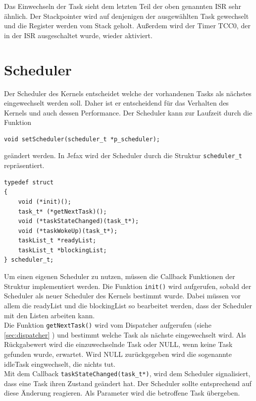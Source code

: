 \documentclass[fontsize=12pt, toc=bibliography, notitlepage]{scrreprt}
\newcommand{\refnn}[1]{\ref{#1} \nameref{#1}}
\begin{document}
Das Einwechseln der Task sieht dem letzten Teil der oben genannten ISR sehr ähnlich. Der Stackpointer wird auf denjenigen der ausgewählten Task gewechselt und die Register werden vom Stack geholt. Außerdem wird der Timer TCC0, der in der ISR ausgeschaltet wurde, wieder aktiviert. 

\newpage

\section{Scheduler}
\label{sec:scheduler}
Der Scheduler des Kernels entscheidet welche der vorhandenen Tasks als nächstes eingewechselt werden soll. Daher ist er entscheidend für das Verhalten des Kernels und auch dessen Performance. Der Scheduler kann zur Laufzeit durch die Funktion

\begin{lstlisting}
void setScheduler(scheduler_t *p_scheduler);
\end{lstlisting}

geändert werden. In Jefax wird der Scheduler durch die Struktur \verb|scheduler_t| repräsentiert.

\begin{lstlisting}[title=scheduler.h]
typedef struct
{
	void (*init)();
	task_t* (*getNextTask)();
	void (*taskStateChanged)(task_t*);
	void (*taskWokeUp)(task_t*);
	taskList_t *readyList;
	taskList_t *blockingList;
} scheduler_t;
\end{lstlisting}

Um einen eigenen Scheduler zu nutzen, müssen die Callback Funktionen der Struktur implementiert werden. Die Funktion \lstinline$init()$ wird aufgerufen, sobald der Scheduler als neuer Scheduler des Kernels bestimmt wurde. Dabei müssen vor allem die readyList und die blockingList so bearbeitet werden, dass der Scheduler mit den Listen arbeiten kann.\\

Die Funktion \lstinline$getNextTask()$ wird vom Dispatcher aufgerufen (siehe \refnn{sec:dispatcher}) und bestimmt welche Task als nächste eingewechselt wird. Als Rückgabewert wird die einzuwechselnde Task oder NULL, wenn keine Task gefunden wurde, erwartet. Wird NULL zurückgegeben wird die sogenannte idleTask eingwechselt, die nichts tut.\\

Mit dem Callback \lstinline$taskStateChanged(task_t*)$, wird dem Scheduler signalisiert, dass eine Task ihren Zustand geändert hat. Der Scheduler sollte entsprechend auf diese Änderung reagieren. Als Parameter wird die betroffene Task übergeben.\\
\end{document}

